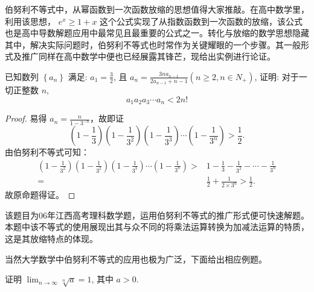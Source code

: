 伯努利不等式中，从幂函数到一次函数放缩的思想值得大家推敲。在高中数学里，利用该思想， $e^{x} \geq 1+x$ 这个公式实现了从指数函数到一次函数的放缩，该公式也是高中导数解题应用中最常见且最重要的公式之一。转化与放缩的数学思想隐藏其中，解决实际问题时，伯努利不等式也时常作为关键耀眼的一个步骤。其一般形式及推广同样在高中数学中便也已经展露其锋芒，现给出实例进行论证。


\begin{example}
  已知数列 $\left\{a_{n}\right\}$ 满足: $a_{1}=\frac{3}{2}$, 且 $a_{n}=\frac{3 n a_{n-1}}{2 a_{n-1}+n-1}\left(n \geq 2, n \in N_{+}\right)$, 证明: 对于一切正整数 $n$, 
  \[a_{1} a_{2} a_{3} \cdots a_{n}<2 n!\]
\end{example}

\begin{proof}
  易得 $a_{n}=\frac{n}{1-3^{-n}}$，故即证 \[\left(1-\frac{1}{3}\right)\left(1-\frac{1}{3^{2}}\right)\left(1-\frac{1}{3^{3}}\right) \cdots\left(1-\frac{1}{3^{n}}\right)>\frac{1}{2}.\]
  由伯努利不等式可知：
  \begin{align*}
    \left(1-\frac{1}{3^{2}}\right)\left(1-\frac{1}{3^{2}}\right)\left(1-\frac{1}{3^{3}}\right) \cdots\left(1-\frac{1}{3^{n}}\right)>&1-\frac{1}{3}-\frac{1}{3^{2}}-\cdots-\frac{1}{3^{n}} \\
    =& \frac{1}{2}+\frac{1}{2 \times 3^{n}}>\frac{1}{2}.
  \end{align*}
  故原命题得证。
\end{proof}

\begin{analysis}
  该题目为06年江西高考理科数学题，运用伯努利不等式的推广形式便可快速解题。本题中该不等式的使用展现出其与众不同的将乘法运算转换为加减法运算的特质，这是其放缩特点的体现。
\end{analysis}

当然大学数学中伯努利不等式的应用也极为广泛，下面给出相应例题。


\begin{example}
  \parencite{华东师大数学分析} 证明 $\lim _{n \rightarrow \infty} \sqrt[n]{a}=1$, 其中 $a>0$. 
\end{example}

